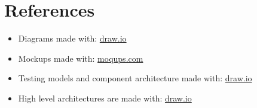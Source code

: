 \section{References}

\begin{itemize}
    \item Diagrams made with: \href{https://app.diagrams.net}{draw.io}
    \item Mockups made with: \href{https://moqups.com/it/}{moqups.com}
    \item Testing models and component architecture made with: \href{https://app.diagrams.net}{draw.io}
    \item High level architectures are made with: \href{https://app.diagrams.net}{draw.io}
\end{itemize}
